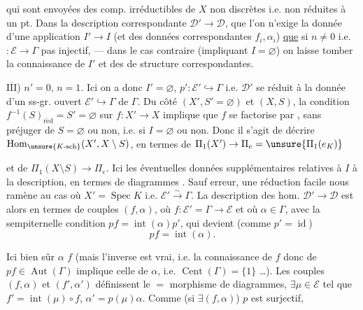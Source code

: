 
qui sont envoyées  des comp. irréductibles de $X$  non discrètes i.e. non réduites à un pt.
Dans la description correspondante $\mathcal D'\to\mathcal D$,  que l'on n'exige la donnée d'une application $I'\to I$ (et des données correspondantes $f_i,\alpha_i$) \uline{que} si  $n\ne0$ i.e. $:\mathcal E\to\Gamma$ pas injectif, --- dans le cas contraire (impliquant $I=\varnothing$)  on laisse tomber la connaissance de $I'$ et des  de structure correspondantes.

\uline{$\overline{\mathrm{III}}$}) $n'=0$, $n=1$. Ici on a donc $I'=\varnothing$, $p':\mathcal E'\hookrightarrow\Gamma$ i.e. $\mathcal D'$ se réduit à la donnée d'un ss-gr. ouvert $\mathcal E'\hookrightarrow\Gamma$ de $\Gamma$.
Du côté $(X',S'=\varnothing)$ et $(X,S)$, la condition $f^{-1}(S)_{\mathrm{r\acute ed}}=S'=\varnothing$ sur  $f:X'\to X$ implique que $f$ se factorise par , sans préjuger de $S=\varnothing$ ou non, i.e. si $I=\varnothing$ ou non. Donc il s'agit de décrire $\operatorname{Hom}_{\unsure{K\text{-sch}}}(X',X\setminus S)$, en termes de  $\Pi_1(X')\to\Pi_e=\unsure{\Pi_1(e_K)}$



et de $\Pi_1(X\setminus S)\to\Pi_e$. 
Ici les éventuelles données supplémentaires relatives à $I$  à la description, en termes de diagrammes  .
Sauf erreur, une réduction facile nous ramène au cas où $X'=\operatorname{Spec}K$ i.e. $\mathcal E'\xrightarrow{\sim}\Gamma$. La description des hom. $\mathcal D'\to\mathcal D$ est alors  en termes de couples $(f,\alpha)$, où $f:\mathcal E'=\Gamma\to\mathcal E$ et où $\alpha\in\Gamma$, avec la sempiternelle condition $pf=\operatorname{int}(\alpha)p'$, qui devient (comme $p'=\operatorname{id}$)
\[
 pf=\operatorname{int}(\alpha).
\]

Ici bien sûr $\alpha$  $f$ (mais l'inverse est   vrai, i.e. la connaissance de $f$ donc de $pf\in\operatorname{Aut}(\Gamma)$ implique celle de $\alpha$, i.e. $\operatorname{Cent}(\Gamma)=\{1\}$ \ldots).
Les couples $(f,\alpha)$ et $(f',\alpha')$ définissent le $=$ morphisme de diagrammes,  $\exists\mu\in\mathcal E$ tel que $f'=\operatorname{int}(\mu)\circ f$, $\alpha'=p(\mu)\alpha$.
Comme (si $\exists(f,\alpha)$) $p$ est surjectif,

